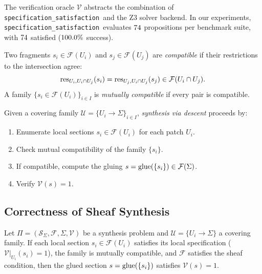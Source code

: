 \documentclass[11pt]{article}
\newcommand{\FragmentSpace}{\mathcal{F}}
\newcommand{\SpecSpace}{\mathcal{S}_\Sigma}
\newcommand{\SpecSat}{\texttt{specification\_satisfaction}}
\begin{document}
The verification oracle $\mathcal{V}$ abstracts the combination of
\SpecSat\ and the Z3 solver backend.  In our experiments, \SpecSat\
evaluates $74$ propositions per benchmark suite, with
$74$ satisfied ($100.0\%$ success).

\begin{definition}\label{def:frag-compat}
Two fragments $s_i \in \FragmentSpace(U_i)$ and
$s_j \in \FragmentSpace(U_j)$ are \emph{compatible} if their
restrictions to the intersection agree:
\[
  \res_{U_i, U_i \cap U_j}(s_i) = \res_{U_j, U_i \cap U_j}(s_j)
  \in \FragmentSpace(U_i \cap U_j).
\]
A family $\{s_i \in \FragmentSpace(U_i)\}_{i \in I}$ is
\emph{mutually compatible} if every pair is compatible.
\end{definition}

\begin{definition}[Synthesis via Descent]\label{def:synth-descent}
Given a covering family $\mathcal{U} = \{U_i \to \Sigma\}_{i \in I}$,
\emph{synthesis via descent} proceeds by:
\begin{enumerate}[noitemsep]
  \item Enumerate local sections $s_i \in \FragmentSpace(U_i)$ for
        each patch $U_i$.
  \item Check mutual compatibility of the family $\{s_i\}$.
  \item If compatible, compute the gluing
        $s = \glue(\{s_i\}) \in \FragmentSpace(\Sigma)$.
  \item Verify $\mathcal{V}(s) = 1$.
\end{enumerate}
\end{definition}

\subsection{Correctness of Sheaf Synthesis}

\begin{theorem}\label{thm:synth-correct}
Let $\Pi = (\SpecSpace, \FragmentSpace, \Sigma, \mathcal{V})$ be a
synthesis problem and $\mathcal{U} = \{U_i \to \Sigma\}$ a covering
family.  If each local section $s_i \in \FragmentSpace(U_i)$ satisfies
its local specification (\ie $\mathcal{V}|_{U_i}(s_i) = 1$), the
family is mutually compatible, and $\FragmentSpace$ satisfies the
sheaf condition, then the glued section $s = \mathrm{glue}(\{s_i\})$
satisfies $\mathcal{V}(s) = 1$.
\end{theorem}
\end{document}
